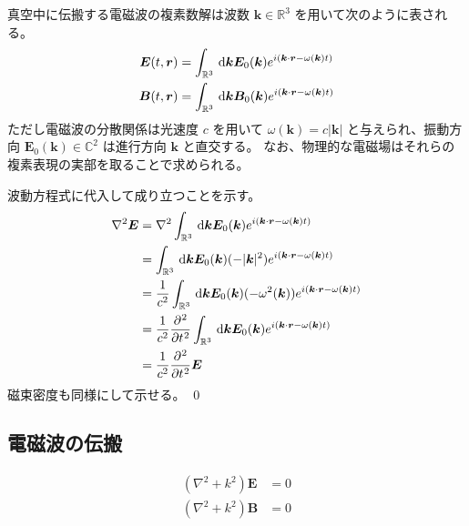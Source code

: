 \documentclass[uplatex,dvipdfmx,a4paper,11pt]{jlreq}
\makeatletter
\newcommand{\CC}{\mathbb{C}}
\newcommand{\RR}{\mathbb{R}}
\newcommand{\EE}{\bm{E}}
\newcommand{\BB}{\bm{B}}
\newcommand{\rr}{\bm{r}}
\newcommand{\kk}{\bm{k}}
\newcommand{\laplacian}{\nabla^2}
\numberwithin{equation}{section}
\theoremstyle{definition}
\renewenvironment{proof}[1][\proofname]{\par
  \normalfont
  \topsep6\p@\@plus6\p@ \trivlist
  \item[\hskip\labelsep{\bfseries #1}\@addpunct{\bfseries}]\ignorespaces\quad\par
}{%
  \qed\endtrivlist\@endpefalse
}
\renewcommand\proofname{証明}
\makeatother
\begin{document}
\begin{theorem}[電磁波の複素数表現]
  真空中に伝搬する電磁波の複素数解は波数 $\kk\in\RR^3$ を用いて次のように表される。
  \begin{align}
    \EE(t, \rr) & = \int_{\RR^3}\dl{\kk}\EE_0(\kk)e^{i(\kk\cdot\rr - \omega(\kk)t)} \\
    \BB(t, \rr) & = \int_{\RR^3}\dl{\kk}\BB_0(\kk)e^{i(\kk\cdot\rr - \omega(\kk)t)}
  \end{align}
  ただし電磁波の分散関係は光速度 $c$ を用いて $\omega(\kk) = c|\kk|$ と与えられ、振動方向 $\EE_0(\kk)\in\CC^2$ は進行方向 $\kk$ と直交する。
  なお、物理的な電磁場はそれらの複素表現の実部を取ることで求められる。
\end{theorem}
\begin{proof}
  波動方程式に代入して成り立つことを示す。
  \begin{align}
    \nabla^2\EE & = \nabla^2\int_{\RR^3}\dl{\kk}\EE_0(\kk)e^{i(\kk\cdot\rr - \omega(\kk)t)}                      \\
                & = \int_{\RR^3}\dl{\kk}\EE_0(\kk)(-|\kk|^2)e^{i(\kk\cdot\rr - \omega(\kk)t)}                    \\
                & = \frac{1}{c^2}\int_{\RR^3}\dl{\kk}\EE_0(\kk)(-\omega^2(\kk))e^{i(\kk\cdot\rr - \omega(\kk)t)} \\
                & = \frac{1}{c^2}\diffp[2]{}{t}\int_{\RR^3}\dl{\kk}\EE_0(\kk)e^{i(\kk\cdot\rr - \omega(\kk)t)}   \\
                & = \frac{1}{c^2}\diffp[2]{}{t}\EE
  \end{align}
  磁束密度も同様にして示せる。
\end{proof}

\begin{theorem}[電磁波のエネルギー]
\end{theorem}

\begin{theorem}[電磁波の運動量]
\end{theorem}

\subsection{電磁波の伝搬}
\begin{theorem}
  \begin{align}
    (\laplacian + k^2)\EE & = 0 \\
    (\laplacian + k^2)\BB & = 0
  \end{align}
\end{theorem}
\end{document}
